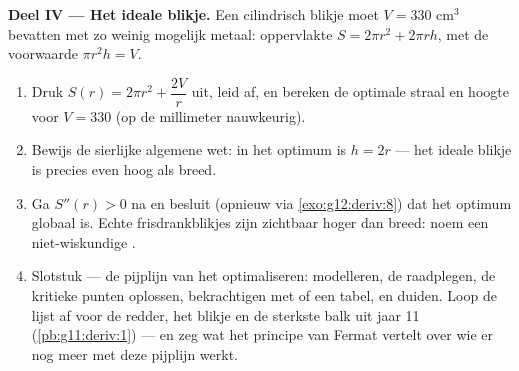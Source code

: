 \begin{problem}
\medskip
\noindent\textbf{Deel IV --- Het ideale blikje.}
Een cilindrisch blikje moet $V = 330$ cm$^3$ bevatten met zo weinig mogelijk
metaal: oppervlakte $S = 2\pi r^2 + 2\pi r h$, met de voorwaarde
$\pi r^2 h = V$.
\begin{enumerate}[resume]
  \item Druk $S(r) = 2\pi r^2 + \dfrac{2V}{r}$ uit, leid af, en bereken de
        optimale straal en hoogte voor $V = 330$ (op de millimeter
        nauwkeurig).
  \item Bewijs de sierlijke algemene wet: in het optimum is $h = 2r$ --- het
        ideale blikje is precies even hoog als breed.
  \item Ga $S''(r) > 0$ na en besluit (opnieuw via \cref{exo:g12:deriv:8}) dat
        het optimum globaal is. Echte frisdrankblikjes zijn zichtbaar hoger
        dan breed: noem een niet-wiskundige .
  \item Slotstuk --- de pijplijn van het optimaliseren: modelleren, de
         raadplegen, de kritieke punten oplossen, bekrachtigen met
         of een tabel, en duiden. Loop de lijst af voor de redder,
        het blikje en de sterkste balk uit jaar 11
        (\cref{pb:g11:deriv:1}) --- en zeg wat het principe van Fermat vertelt
        over wie er nog meer met deze pijplijn werkt.
\end{enumerate}
\end{problem}
